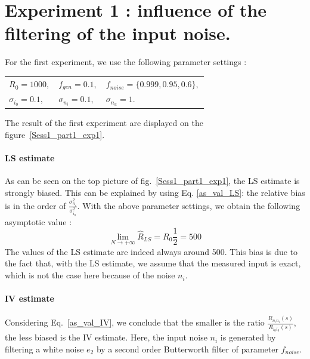 \section{Experiment 1 : influence of the filtering of the input noise.}
For the first experiment, we use the following parameter settings : 

\begin{table}[h]
\centering
\begin{tabular}{lll}
    $ R_0 = 1000, $  &  $ f_{gen} = 0.1, $ & $ f_{noise} = \{ 0.999, 0.95, 0.6 \},$  \\
    $ \sigma_{i_0} = 0.1, $  &  $ \sigma_{n_i} = 0.1, $ & $ \sigma_{n_u} = 1.$  \\
\end{tabular}
\end{table}
The result of the first experiment are displayed on the figure~\ref{Sess1_part1_exp1}.

\paragraph{LS estimate} As can be seen on the top picture of fig.~\ref{Sess1_part1_exp1}, the LS estimate is strongly biased. This can be explained by using Eq. \ref{as_val_LS}: the  relative bias is in the order of $\frac{\sigma_{n_i}^2}{\sigma_{i_0}^2}$. With the above parameter settings, we obtain the following asymptotic value :
$$ \lim\limits_{N \rightarrow +\infty} \hat{R}_{LS} = R_0 \frac{1}{2}  = 500 $$ 
The values of the LS estimate are indeed always around 500. This bias is due to the fact that, with the LS estimate, we assume that the measured input is exact, which is not the case here because of the noise $n_i$. 

\paragraph{IV estimate} Considering Eq.~\ref{as_val_IV}, we conclude that the smaller is the ratio $\frac{R_{n_i n_i}(s)}{R_{i_0 i_0}(s)}$, the less biased is the IV estimate. 
Here, the input noise $n_i$ is generated by filtering a white noise $e_2$ by a second order Butterworth filter of parameter $f_{noise}$. 

